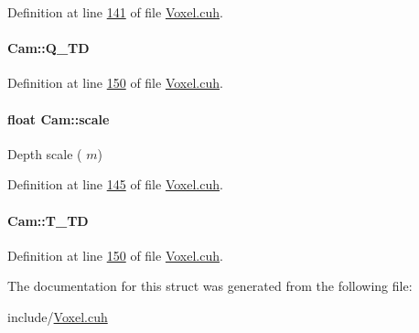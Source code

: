 Definition at line \hyperlink{Voxel_8cuh_source_l00141}{141} of file \hyperlink{Voxel_8cuh_source}{Voxel.\+cuh}.

\paragraph[{\texorpdfstring{Q\+\_\+\+TD}{Q_TD}}]{ Cam\+::\+Q\+\_\+\+TD}\hypertarget{structCam_a8b6ed5501753ad64cf3e36f798fbf3cd}{}\label{structCam_a8b6ed5501753ad64cf3e36f798fbf3cd}


Definition at line \hyperlink{Voxel_8cuh_source_l00150}{150} of file \hyperlink{Voxel_8cuh_source}{Voxel.\+cuh}.

\paragraph[{\texorpdfstring{scale}{scale}}]{\setlength{\rightskip}{0pt plus 5cm}float Cam\+::scale}\hypertarget{structCam_a99a4c54ed1a408665a0963f308008ec8}{}\label{structCam_a99a4c54ed1a408665a0963f308008ec8}


Depth scale ( $ \textit{m}$) 



Definition at line \hyperlink{Voxel_8cuh_source_l00145}{145} of file \hyperlink{Voxel_8cuh_source}{Voxel.\+cuh}.

\paragraph[{\texorpdfstring{T\+\_\+\+TD}{T_TD}}]{ Cam\+::\+T\+\_\+\+TD}\hypertarget{structCam_a05f5a946647cd44a473b0fd03186ca96}{}\label{structCam_a05f5a946647cd44a473b0fd03186ca96}


Definition at line \hyperlink{Voxel_8cuh_source_l00150}{150} of file \hyperlink{Voxel_8cuh_source}{Voxel.\+cuh}.



The documentation for this struct was generated from the following file\+:\begin{DoxyCompactItemize}
\item 
include/\hyperlink{Voxel_8cuh}{Voxel.\+cuh}\end{DoxyCompactItemize}
